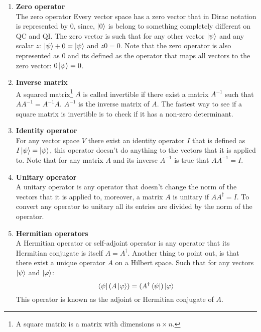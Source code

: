 \begin{enumerate}
	\item \textbf{Zero operator} \\
	The zero operator Every vector space has a zero vector that in Dirac notation is represented by $0$, since, $\ket{0}$ is belong to something completely different on QC and QI. The zero vector is such that for any other vector $\ket{\psi}$ and any scalar $z$:
	$\ket{\psi} + 0 = \ket{\psi} $ and $z0 = 0$. 
	Note that the zero operator is also represented as 0 and its defined as the operator that maps all vectors to the zero vector: $0\ket{\psi} = 0 $.  
	
	\item \textbf{Inverse matrix} \\
	A squared matrix\footnote{A square matrix is a matrix with dimensions $n\times n$.} $A$ is called invertible if there exist a matrix $A^{-1}$ such that $AA^{-1}=A^{-1}A$. $A^{-1}$ is the inverse matrix of $A$. The fastest way to see if a square matrix is invertible is to check if it has a non-zero determinant.  
	
	\item \textbf{Identity operator} \\
	For any vector space $V$ there exist an identity operator $I$ that is defined as $I\ket{\psi} = \ket{\psi}$, this operator doesn't do anything to the vectors that it is applied to. Note that for any matrix $A$ and its inverse $A^{-1}$ is true that $AA^{-1} = I$.
	
	\item \textbf{Unitary operator} \\
	A unitary operator is any operator that doesn't change the norm of the vectors that it is applied to, moreover, a matrix $A$ is unitary if $AA^\dagger = I$. 
	To convert any operator to unitary all its entries are divided by the norm of the operator. 
	
	\item \textbf{Hermitian operators} \\
	A Hermitian operator or self-adjoint operator is any operator that its Hermitian conjugate is itself $A = A^\dagger$. Another thing to point out, is that there exist a unique operator $A$ on a Hilbert space. Such that for any vectors $\ket{\psi}$ and $\ket{\varphi}$:
	$$
	\bra{\psi} (A \ket{\varphi}) = (A^\dagger\bra{\psi})\ket{\varphi}
	$$ 
	This operator is known as the adjoint or Hermitian conjugate of $A$.
	
\end{enumerate}

